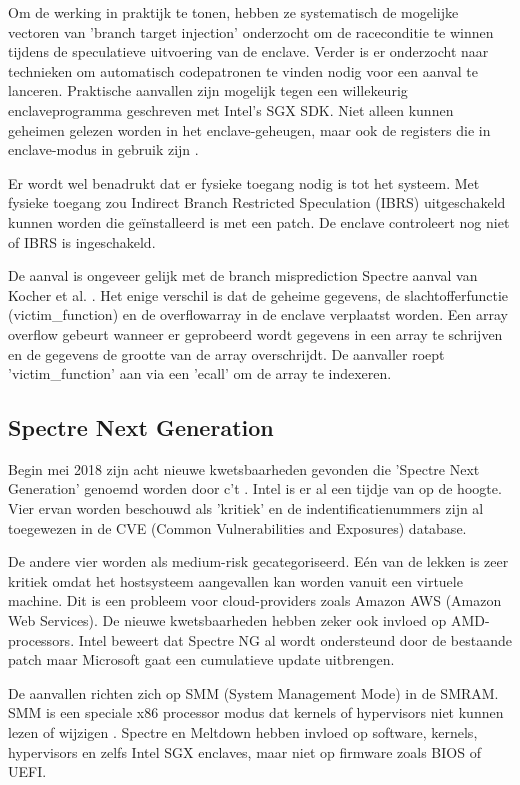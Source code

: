 Om de werking in praktijk te tonen, hebben ze systematisch de mogelijke vectoren van 'branch target injection' onderzocht om de raceconditie te winnen tijdens de speculatieve uitvoering van de enclave. Verder is er onderzocht naar technieken om automatisch codepatronen te vinden nodig voor een aanval te lanceren. Praktische aanvallen zijn mogelijk tegen een willekeurig  enclaveprogramma geschreven met Intel's SGX SDK. Niet alleen kunnen geheimen gelezen worden in het enclave-geheugen, maar ook de registers die in enclave-modus in gebruik zijn \parencite{Chen2018}.

Er wordt wel benadrukt dat er fysieke toegang nodig is tot het systeem. Met fysieke toegang zou Indirect Branch Restricted Speculation (IBRS) uitgeschakeld kunnen worden die geïnstalleerd is met een patch.
De enclave controleert nog niet of IBRS is ingeschakeld.

De aanval is ongeveer gelijk met de branch misprediction Spectre aanval van Kocher et al. \parencite{Kocher2018}. Het enige verschil is dat de geheime gegevens, de slachtofferfunctie (victim\_function) en de overflowarray in de enclave verplaatst worden.
Een array overflow gebeurt wanneer er geprobeerd wordt gegevens in een array te schrijven en de gegevens de grootte van de array overschrijdt.
De aanvaller roept 'victim\_function' aan via een 'ecall' om de array te indexeren. \parencite{Tian2018}

\subsection{Spectre Next Generation}
Begin mei 2018 zijn acht nieuwe kwetsbaarheden gevonden die 'Spectre Next Generation' genoemd worden door c't \parencite{Schmidt2018}. Intel is er al een tijdje van op de hoogte.
Vier ervan worden beschouwd als 'kritiek' en de indentificatienummers zijn al toegewezen in de CVE (Common Vulnerabilities and Exposures) database.

De andere vier worden als medium-risk gecategoriseerd.
Eén van de lekken is zeer kritiek omdat het hostsysteem aangevallen kan worden vanuit een virtuele machine. Dit is een probleem voor cloud-providers zoals Amazon AWS (Amazon Web Services).
De nieuwe kwetsbaarheden hebben zeker ook invloed op AMD-processors.
Intel beweert dat Spectre NG al wordt ondersteund door de bestaande patch maar Microsoft gaat een cumulatieve update uitbrengen.

De aanvallen richten zich op SMM (System Management Mode) in de SMRAM.
SMM is een speciale x86 processor modus dat kernels of hypervisors niet kunnen lezen of wijzigen \parencite{Delgado2013}.
Spectre en Meltdown hebben invloed op software, kernels, hypervisors en zelfs Intel SGX enclaves, maar niet op firmware zoals BIOS of UEFI.


